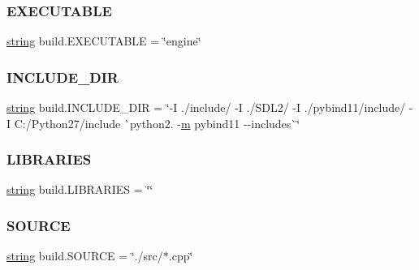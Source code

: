 \mbox{\label{namespacebuild_ad848a55f54f2234a8c862b0c3597ac1b}} 
\subsubsection{\texorpdfstring{EXECUTABLE}{EXECUTABLE}}
{\footnotesize\ttfamily \mbox{\hyperlink{asdl_8h_ae84541b4f3d8e1ea24ec0f466a8c568b}{string}} build.\+E\+X\+E\+C\+U\+T\+A\+B\+LE = \char`\"{}engine\char`\"{}}

\mbox{\label{namespacebuild_af7dbc41885851b81d2588a14a5523d92}} 
\subsubsection{\texorpdfstring{INCLUDE\_DIR}{INCLUDE\_DIR}}
{\footnotesize\ttfamily \mbox{\hyperlink{asdl_8h_ae84541b4f3d8e1ea24ec0f466a8c568b}{string}} build.\+I\+N\+C\+L\+U\+D\+E\+\_\+\+D\+IR = \char`\"{}-\/I ./include/ -\/I ./S\+D\+L2/ -\/I ./pybind11/include/ -\/I C\+:/Python27/include \`{}python2. -\/\mbox{\hyperlink{_s_d_l__opengl__glext_8h_af593500c283bf1a787a6f947f503a5c2}{m}} pybind11 -\/-\/includes\`{}\char`\"{}}

\mbox{\label{namespacebuild_ac41b6d1c6acdf4c0ab8bdc6f6c2eabda}} 
\subsubsection{\texorpdfstring{LIBRARIES}{LIBRARIES}}
{\footnotesize\ttfamily \mbox{\hyperlink{asdl_8h_ae84541b4f3d8e1ea24ec0f466a8c568b}{string}} build.\+L\+I\+B\+R\+A\+R\+I\+ES = \char`\"{}\char`\"{}}

\mbox{\label{namespacebuild_a832e50b60ae1bc20032caf0540c2176b}} 
\subsubsection{\texorpdfstring{SOURCE}{SOURCE}}
{\footnotesize\ttfamily \mbox{\hyperlink{asdl_8h_ae84541b4f3d8e1ea24ec0f466a8c568b}{string}} build.\+S\+O\+U\+R\+CE = \char`\"{}./src/$\ast$.cpp\char`\"{}}

